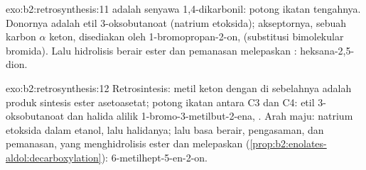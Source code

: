\begin{solution}{exo:b2:retrosynthesis:11}
 adalah senyawa 1,4-dikarbonil: potong ikatan 
tengahnya. Donornya adalah  etil 3-oksobutanoat (natrium etoksida);
akseptornya, sebuah karbon $\alpha$ keton, disediakan oleh
1-bromopropan-2-on,  (substitusi bimolekular bromida). Lalu
hidrolisis berair ester dan pemanasan melepaskan : heksana-2,5-dion.
\end{solution}

\begin{solution}{exo:b2:retrosynthesis:12}
Retrosintesis: metil keton dengan  di sebelahnya adalah produk
sintesis ester asetoasetat; potong ikatan antara C3 dan C4:  etil
3-oksobutanoat dan halida alilik 1-bromo-3-metilbut-2-ena,
. Arah maju: natrium etoksida dalam etanol, lalu
halidanya; lalu basa berair, pengasaman, dan pemanasan, yang menghidrolisis
ester dan melepaskan 
(\cref{prop:b2:enolates-aldol:decarboxylation}): 6-metilhept-5-en-2-on.
\end{solution}

